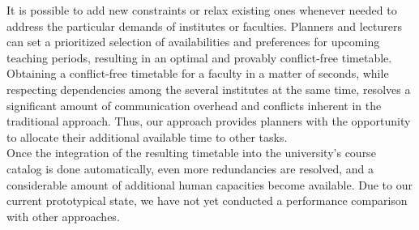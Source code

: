 \documentclass{easychair}
\begin{document}
  It is possible to add new constraints or relax existing ones whenever needed to address the particular demands of institutes or faculties. 
  Planners and lecturers can set a prioritized selection of availabilities and preferences for upcoming teaching periods, resulting in an optimal and provably conflict-free timetable.
  Obtaining a conflict-free timetable for a faculty in a matter of seconds, while respecting dependencies among the several institutes at the same time, resolves a significant amount of communication overhead and conflicts inherent in the traditional approach. 
  Thus, our approach provides planners with the opportunity to allocate their additional available time to other tasks. \\
  Once the integration of the resulting timetable into the university's course catalog is done automatically, even more redundancies are resolved, and a considerable amount of additional human capacities become available. 
  Due to our current prototypical state, we have not yet conducted a performance comparison with other approaches\cite{feutrier23a}. 




\end{document}
